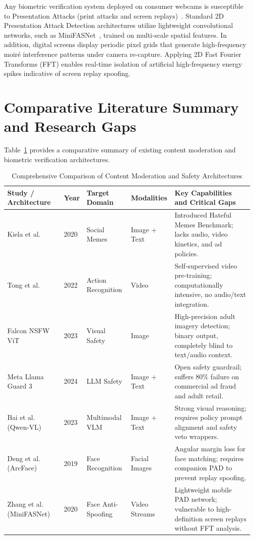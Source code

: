 \documentclass[12pt,a4paper]{report}
\begin{document}
Any biometric verification system deployed on consumer webcams is susceptible to Presentation Attacks (print attacks and screen replays)~\cite{yu2020nasfas}. Standard 2D Presentation Attack Detection architectures utilize lightweight convolutional networks, such as MiniFASNet~\cite{zhang2020minifasnet}, trained on multi-scale spatial features. In addition, digital screens display periodic pixel grids that generate high-frequency moir\'{e} interference patterns under camera re-capture. Applying 2D Fast Fourier Transforms (FFT) enables real-time isolation of artificial high-frequency energy spikes indicative of screen replay spoofing.

\section{Comparative Literature Summary and Research Gaps}
Table~\ref{tab:lit_comparison} provides a comparative summary of existing content moderation and biometric verification architectures.

\begin{table}[htbp]
\centering
\caption{Comprehensive Comparison of Content Moderation and Safety Architectures}
\label{tab:lit_comparison}
\scriptsize
\begin{tabular}{@{}p{2.6cm}p{1.0cm}p{2.6cm}p{2.6cm}p{5.5cm}@{}}
\toprule
\textbf{Study / Architecture} & \textbf{Year} & \textbf{Target Domain} & \textbf{Modalities} & \textbf{Key Capabilities and Critical Gaps} \\
\midrule
Kiela et al.~\cite{kiela2020hateful} & 2020 & Social Memes & Image + Text & Introduced Hateful Memes Benchmark; lacks audio, video kinetics, and ad policies. \\
Tong et al.~\cite{tong2022videomae} & 2022 & Action Recognition & Video & Self-supervised video pre-training; computationally intensive, no audio/text integration. \\
Falcon NSFW ViT~\cite{falcon2023nsfw} & 2023 & Visual Safety & Image & High-precision adult imagery detection; binary output, completely blind to text/audio context. \\
Meta Llama Guard 3~\cite{metallama2024} & 2024 & LLM Safety & Image + Text & Open safety guardrail; suffers $80\%$ failure on commercial ad fraud and adult retail. \\
Bai et al. (Qwen-VL)~\cite{bai2023qwen} & 2023 & Multimodal VLM & Image + Text & Strong visual reasoning; requires policy prompt alignment and safety veto wrappers. \\
Deng et al. (ArcFace)~\cite{deng2019arcface} & 2019 & Face Recognition & Facial Images & Angular margin loss for face matching; requires companion PAD to prevent replay spoofing. \\
Zhang et al. (MiniFASNet)~\cite{zhang2020minifasnet} & 2020 & Face Anti-Spoofing & Video Streams & Lightweight mobile PAD network; vulnerable to high-definition screen replays without FFT analysis. \\
\bottomrule
\end{tabular}
\end{table}
\end{document}
